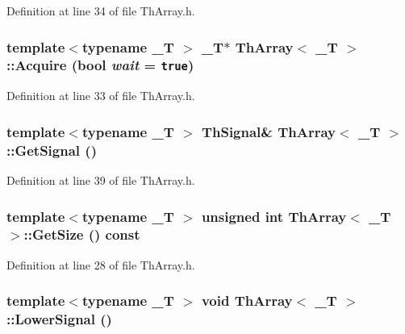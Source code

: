 Definition at line 34 of file ThArray.h.\hypertarget{class_th_array_2cbd34eb6cb4e16974f6f38a3c3dd29f}{
\subsubsection[{Acquire}]{\setlength{\rightskip}{0pt plus 5cm}template$<$typename \_\-T $>$ \_\-T$\ast$ {\bf ThArray}$<$ \_\-T $>$::Acquire (bool {\em wait} = {\tt true})}}
\label{class_th_array_2cbd34eb6cb4e16974f6f38a3c3dd29f}




Definition at line 33 of file ThArray.h.\hypertarget{class_th_array_a57430fcbaba277c7fe0e5daf5388fee}{
\subsubsection[{GetSignal}]{\setlength{\rightskip}{0pt plus 5cm}template$<$typename \_\-T $>$ {\bf ThSignal}\& {\bf ThArray}$<$ \_\-T $>$::GetSignal ()}}
\label{class_th_array_a57430fcbaba277c7fe0e5daf5388fee}




Definition at line 39 of file ThArray.h.\hypertarget{class_th_array_cd3e0922e77945739c44b6777018f573}{
\subsubsection[{GetSize}]{\setlength{\rightskip}{0pt plus 5cm}template$<$typename \_\-T $>$ unsigned int {\bf ThArray}$<$ \_\-T $>$::GetSize () const}}
\label{class_th_array_cd3e0922e77945739c44b6777018f573}




Definition at line 28 of file ThArray.h.\hypertarget{class_th_array_c9477c14645b87640a89fa95013e8f12}{
\subsubsection[{LowerSignal}]{\setlength{\rightskip}{0pt plus 5cm}template$<$typename \_\-T $>$ void {\bf ThArray}$<$ \_\-T $>$::LowerSignal ()}}
\label{class_th_array_c9477c14645b87640a89fa95013e8f12}




